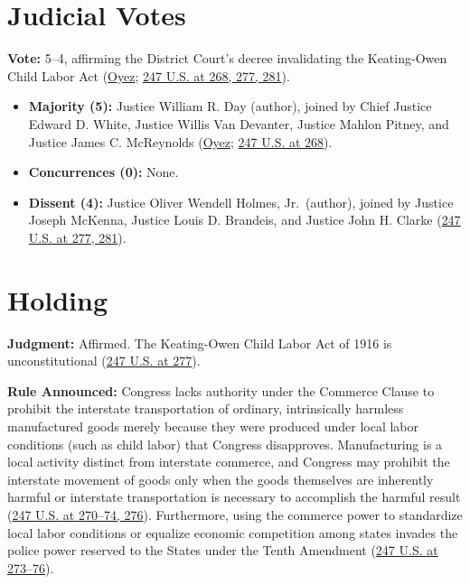 \documentclass[12pt]{article}
\begin{document}
\section{Judicial Votes}
\textbf{Vote:} 5--4, affirming the District Court's decree invalidating the Keating-Owen Child Labor Act (\href{https://www.oyez.org/cases/1900-1940/247us251}{Oyez}; \href{https://supreme.justia.com/cases/federal/us/247/251/}{247 U.S. at 268, 277, 281}).
\begin{itemize}
\item \textbf{Majority (5):} Justice William R. Day (author), joined by Chief Justice Edward D. White, Justice Willis Van Devanter, Justice Mahlon Pitney, and Justice James C. McReynolds (\href{https://www.oyez.org/cases/1900-1940/247us251}{Oyez}; \href{https://supreme.justia.com/cases/federal/us/247/251/}{247 U.S. at 268}).
\item \textbf{Concurrences (0):} None.
\item \textbf{Dissent (4):} Justice Oliver Wendell Holmes, Jr.\ (author), joined by Justice Joseph McKenna, Justice Louis D. Brandeis, and Justice John H. Clarke (\href{https://supreme.justia.com/cases/federal/us/247/251/}{247 U.S. at 277, 281}).
\end{itemize}

\section{Holding}
\textbf{Judgment:} Affirmed. The Keating-Owen Child Labor Act of 1916 is unconstitutional (\href{https://supreme.justia.com/cases/federal/us/247/251/}{247 U.S. at 277}).

\textbf{Rule Announced:} Congress lacks authority under the Commerce Clause to prohibit the interstate transportation of ordinary, intrinsically harmless manufactured goods merely because they were produced under local labor conditions (such as child labor) that Congress disapproves. Manufacturing is a local activity distinct from interstate commerce, and Congress may prohibit the interstate movement of goods only when the goods themselves are inherently harmful or interstate transportation is necessary to accomplish the harmful result (\href{https://supreme.justia.com/cases/federal/us/247/251/}{247 U.S. at 270--74, 276}). Furthermore, using the commerce power to standardize local labor conditions or equalize economic competition among states invades the police power reserved to the States under the Tenth Amendment (\href{https://supreme.justia.com/cases/federal/us/247/251/}{247 U.S. at 273--76}).
\end{document}
